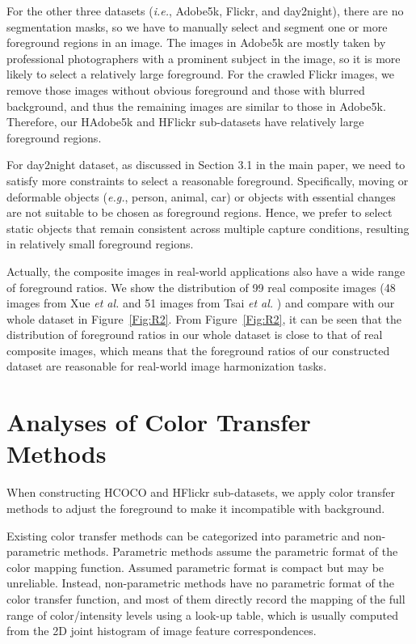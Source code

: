 \documentclass[10pt,twocolumn,letterpaper]{article}
\begin{document}
For the other three datasets (\textit{i.e.}, Adobe5k\cite{bychkovsky2011learningsupp}, Flickr, and day2night\cite{Laffont14supp}), there are no segmentation masks, so we have to manually select and segment one or more foreground regions in an image. The images in Adobe5k are mostly taken by professional photographers with a prominent subject in the image, so it is more likely to select a relatively large foreground. For the crawled Flickr images, we remove those images without obvious foreground and those with blurred background, and thus the remaining images are similar to those in Adobe5k. Therefore, our HAdobe5k and HFlickr sub-datasets have relatively large foreground regions.

For day2night dataset, as discussed in Section 3.1 in the main paper, we need to satisfy more constraints to select a reasonable foreground. Specifically, moving or deformable objects (\emph{e.g.}, person, animal, car) or objects with essential changes are not suitable to be chosen as foreground regions. Hence, we prefer to select static objects that remain consistent across multiple capture conditions, resulting in relatively small foreground regions.

Actually, the composite images in real-world applications also have a wide range of foreground ratios. We show the distribution of 99 real composite images (48 images from Xue \textit{et al.} \cite{xue2012understandingsupp} and 51 images from Tsai \textit{et al.} \cite{tsai2017deepsupp}) and compare with our whole dataset in Figure~\ref{Fig:R2}. From Figure~\ref{Fig:R2}, it can be seen that the distribution of foreground ratios in our whole dataset is close to that of real composite images, which means that the foreground ratios of our constructed dataset are reasonable for real-world image harmonization tasks.

\section{Analyses of Color Transfer Methods}\label{sec:color_transfer}
When constructing HCOCO and HFlickr sub-datasets, we apply color transfer methods to adjust the foreground to make it incompatible with background. 

Existing color transfer methods can be categorized into parametric and non-parametric methods. Parametric methods assume the parametric format of the color mapping function. Assumed parametric format is compact but may be unreliable. Instead, non-parametric methods have no parametric format of the color transfer function, and most of them directly record the mapping of the full range of color/intensity levels using a look-up table, which is usually computed from the 2D joint histogram of image feature correspondences.
\end{document}
